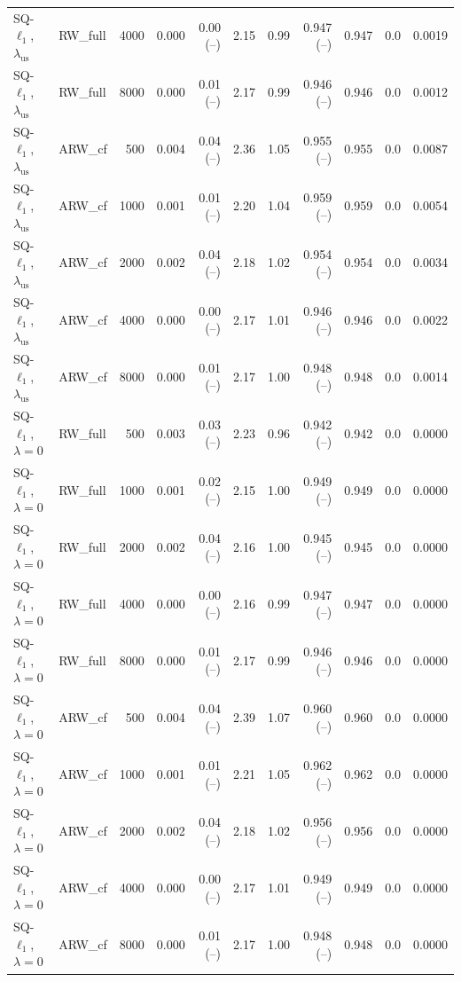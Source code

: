 \begin{tabular}{llrrrrrrrrr}
SQ-$\ell_1$, $\lambda_{\mathrm{us}}$ & RW\_full & 4000 & 0.000 & 0.00 (--) & 2.15 & 0.99 & 0.947 (--) & 0.947 & 0.0 & 0.0019 \\
SQ-$\ell_1$, $\lambda_{\mathrm{us}}$ & RW\_full & 8000 & 0.000 & 0.01 (--) & 2.17 & 0.99 & 0.946 (--) & 0.946 & 0.0 & 0.0012 \\
SQ-$\ell_1$, $\lambda_{\mathrm{us}}$ & ARW\_cf & 500 & 0.004 & 0.04 (--) & 2.36 & 1.05 & 0.955 (--) & 0.955 & 0.0 & 0.0087 \\
SQ-$\ell_1$, $\lambda_{\mathrm{us}}$ & ARW\_cf & 1000 & 0.001 & 0.01 (--) & 2.20 & 1.04 & 0.959 (--) & 0.959 & 0.0 & 0.0054 \\
SQ-$\ell_1$, $\lambda_{\mathrm{us}}$ & ARW\_cf & 2000 & 0.002 & 0.04 (--) & 2.18 & 1.02 & 0.954 (--) & 0.954 & 0.0 & 0.0034 \\
SQ-$\ell_1$, $\lambda_{\mathrm{us}}$ & ARW\_cf & 4000 & 0.000 & 0.00 (--) & 2.17 & 1.01 & 0.946 (--) & 0.946 & 0.0 & 0.0022 \\
SQ-$\ell_1$, $\lambda_{\mathrm{us}}$ & ARW\_cf & 8000 & 0.000 & 0.01 (--) & 2.17 & 1.00 & 0.948 (--) & 0.948 & 0.0 & 0.0014 \\
SQ-$\ell_1$, $\lambda=0$ & RW\_full & 500 & 0.003 & 0.03 (--) & 2.23 & 0.96 & 0.942 (--) & 0.942 & 0.0 & 0.0000 \\
SQ-$\ell_1$, $\lambda=0$ & RW\_full & 1000 & 0.001 & 0.02 (--) & 2.15 & 1.00 & 0.949 (--) & 0.949 & 0.0 & 0.0000 \\
SQ-$\ell_1$, $\lambda=0$ & RW\_full & 2000 & 0.002 & 0.04 (--) & 2.16 & 1.00 & 0.945 (--) & 0.945 & 0.0 & 0.0000 \\
SQ-$\ell_1$, $\lambda=0$ & RW\_full & 4000 & 0.000 & 0.00 (--) & 2.16 & 0.99 & 0.947 (--) & 0.947 & 0.0 & 0.0000 \\
SQ-$\ell_1$, $\lambda=0$ & RW\_full & 8000 & 0.000 & 0.01 (--) & 2.17 & 0.99 & 0.946 (--) & 0.946 & 0.0 & 0.0000 \\
SQ-$\ell_1$, $\lambda=0$ & ARW\_cf & 500 & 0.004 & 0.04 (--) & 2.39 & 1.07 & 0.960 (--) & 0.960 & 0.0 & 0.0000 \\
SQ-$\ell_1$, $\lambda=0$ & ARW\_cf & 1000 & 0.001 & 0.01 (--) & 2.21 & 1.05 & 0.962 (--) & 0.962 & 0.0 & 0.0000 \\
SQ-$\ell_1$, $\lambda=0$ & ARW\_cf & 2000 & 0.002 & 0.04 (--) & 2.18 & 1.02 & 0.956 (--) & 0.956 & 0.0 & 0.0000 \\
SQ-$\ell_1$, $\lambda=0$ & ARW\_cf & 4000 & 0.000 & 0.00 (--) & 2.17 & 1.01 & 0.949 (--) & 0.949 & 0.0 & 0.0000 \\
SQ-$\ell_1$, $\lambda=0$ & ARW\_cf & 8000 & 0.000 & 0.01 (--) & 2.17 & 1.00 & 0.948 (--) & 0.948 & 0.0 & 0.0000 \\

\end{tabular}
